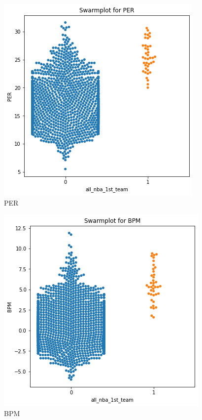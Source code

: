 \documentclass[a4paper]{article}
\begin{document}
\begin{figure}[h!]
\begin{center}
\includegraphics[scale=0.40]{swarm_plot_per.png}
\end{center}
\caption{PER}
\label{plt:swarm_plot_per}
\end{figure}

\begin{figure}[h!]
\begin{center}
\includegraphics[scale=0.40]{swarm_plot_bpm.png}
\end{center}
\caption{BPM}
\label{plt:swarm_plot_bpm}
\end{figure}
\end{document}
